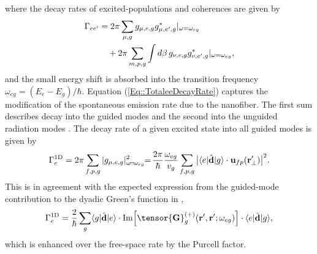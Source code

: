 \documentclass[aps,pra,twocolumn]{revtex4-1} %
\newcommand{\oneD}{{\rm 1D}}
\begin{document}
where the decay rates of excited-populations and coherences are given by 
	\begin{align}
		\Gamma_{ee'} &= 2\pi \sum_{\mu,g} g_{\mu,e,g}g^*_{\mu,e',g} \vert_{\omega=\omega_{eg}}\nonumber\\
		&\quad +2\pi 
\sum_{m,p,g} \int d\beta \, g_{\nu,e,g}g^*_{\nu,e',g} \vert_{\omega=\omega_{eg}}, \label{Eq::TotaleeDecayRate}
	\end{align}
and the small energy shift is absorbed into the transition frequency $\omega_{eg} = (E_e - E_g)/\hbar$.  
Equation (\ref{Eq::TotaleeDecayRate}) captures the modification of the spontaneous emission rate due to the nanofiber.  
The first sum describes decay into the guided modes and the second into the unguided radiation modes \cite{ nha_cavity_1997,klimov_spontaneous_2004,le_kien_spontaneous_2005,maslov_distribution_2006, scheel_directional_2015}. The decay rate of a given excited state into all guided modes is given by
	\begin{equation}
		\Gamma_e^{\oneD}= 2\pi \sum_{f,p,g} |g_{\mu,e,g} |^2_{\omega \!=\! \omega_{eg}} \!\!=\!  \frac{ 2\pi }{\hbar} \frac{ \omega_{eg} }{v_g} \sum_{f,p,g} \big|\bra{e}\hat{\mathbf{d}}\ket{g} \cdot \mathbf{u}_{fp}(\br'_\perp)\big|^2  .
	\end{equation}
This is in agreement with the expected expression from the guided-mode contribution to the dyadic Green's function in ,
	\begin{equation} \label{Eq::Gamma1DGreens}
		\Gamma_e^{\oneD} =  \frac{2}{\hbar} \sum_{g}  \bra{g}\hat{\mathbf{d}}\ket{e}\cdot 
{\rm Im} \Big[\tensor{\mathbf{G}}^{(+)}_g(\br', \br'; \omega_{eg} ) \Big] \cdot \bra{e}\hat{\mathbf{d}}\ket{g},
	\end{equation}
which is enhanced over the free-space rate by the Purcell factor. 
\end{document}

